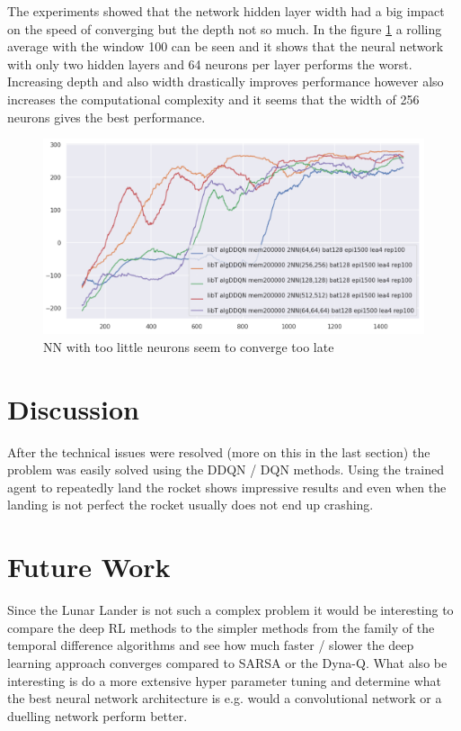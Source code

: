 \documentclass{article}
\begin{document}
The experiments showed that the network hidden layer width had a big impact on the speed of converging but the depth not so much. In the figure \ref{fig:3} a rolling average with the window 100 can be seen and it shows that the neural network with only two hidden layers and 64 neurons per layer performs the worst. Increasing depth and also width drastically improves performance however also increases the computational complexity and it seems that the width of 256 neurons gives the best performance.

\begin{figure}[!h]
  \centering
	\includegraphics[width=1.0\textwidth]{figures/nnwidth.png}
  \caption{NN with too little neurons seem to converge too late}
  \label{fig:3}
\end{figure}

\section{Discussion}
After the technical issues were resolved (more on this in the last section) the problem was easily solved using the DDQN / DQN methods. Using the trained agent to repeatedly land the rocket shows impressive results and even when the landing is not perfect the rocket usually does not end up crashing. 

\section{Future Work}
Since the Lunar Lander is not such a complex problem it would be interesting to compare the deep RL methods to the simpler methods from the family of the temporal difference algorithms and see how much faster / slower the deep learning approach converges compared to SARSA or the Dyna-Q. What also be interesting is do a more extensive hyper parameter tuning and determine what the best neural network architecture is e.g. would a convolutional network or a duelling network perform better.
\end{document}
